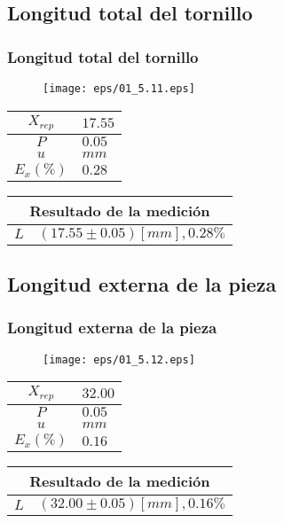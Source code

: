 \documentclass[letter,11pt]{beamer}
\begin{document}
\subsection{Longitud total del tornillo}
\begin{frame}
\frametitle{Longitud total del tornillo}
\vspace*{0.8cm}
\begin{figure}
\centering
\texttt{[image: eps/01\_5.11.eps]}
\end{figure}
\vspace*{0.4cm}
\scriptsize
\begin{tabular}{|c|>{\centering}m{1.8cm}<{\centering}|}
\hline
$X_{rep}$ &  $17.55$ \tabularnewline \hline
      $P$ &   $0.05$ \tabularnewline \hline
      $u$ &     $mm$ \tabularnewline \hline
$E_x(\%)$ &   $0.28$ \tabularnewline \hline
\end{tabular}
\quad
\begin{tabular}{|c|>{\centering}m{5.7cm}<{\centering}|}
\hline
\multicolumn{2}{|c|}{\textbf{Resultado de la medición}} \\ \hline
$L$ & $( 17.55\pm0.05)[mm], 0.28\%$ \tabularnewline \hline
\end{tabular}
\end{frame}

\subsection{Longitud externa de la pieza}
\begin{frame}
\frametitle{Longitud externa de la pieza}
\vspace*{0.8cm}
\begin{figure}
\centering
\texttt{[image: eps/01\_5.12.eps]}
\end{figure}
\vspace*{0.4cm}
\scriptsize
\begin{tabular}{|c|>{\centering}m{1.8cm}<{\centering}|}
\hline
$X_{rep}$ &  $32.00$ \tabularnewline \hline
      $P$ &   $0.05$ \tabularnewline \hline
      $u$ &     $mm$ \tabularnewline \hline
$E_x(\%)$ &   $0.16$ \tabularnewline \hline
\end{tabular}
\quad
\begin{tabular}{|c|>{\centering}m{5.7cm}<{\centering}|}
\hline
\multicolumn{2}{|c|}{\textbf{Resultado de la medición}} \\ \hline
$L$ & $( 32.00\pm0.05)[mm], 0.16\%$ \tabularnewline \hline
\end{tabular}
\end{frame}
\end{document}
